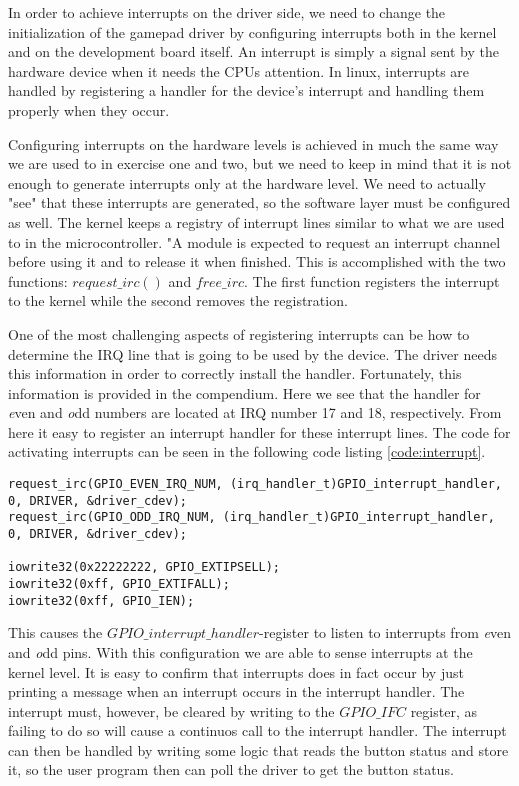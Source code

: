In order to achieve interrupts on the driver side, we need to change the initialization of the gamepad driver by configuring interrupts both in the kernel and on the development board itself. An interrupt is simply a signal sent by the hardware device when it needs the CPUs attention. In linux, interrupts are handled by registering a handler for the device's interrupt and handling them properly when they occur. 

Configuring interrupts on the hardware levels is achieved in much the same way we are used to in exercise one and two, but we need to keep in mind that it is not enough to generate interrupts only at the hardware level. We need to actually "see" that these interrupts are generated, so the software layer must be configured as well. The kernel keeps a registry of interrupt lines similar to what we are used to in the microcontroller. "A module is expected to request an interrupt channel before using it and to release it when finished. This is accomplished with the two functions: $request\_irc()$ and $free\_irc$. The first function registers the interrupt to the kernel while the second removes the registration. 

One of the most challenging aspects of registering interrupts can be how to determine the IRQ line that is going to be used by the device. The driver needs this information in order to correctly install the handler. Fortunately, this information is provided in the compendium. Here we see that the handler for {\emph even} and {\emph odd} numbers are located at IRQ number 17 and 18, respectively. From here it easy to register an interrupt handler for these interrupt lines. The code for activating interrupts can be seen in the following code listing \ref{code:interrupt}.

\begin{lstlisting}[caption=Activate interupts, label=code:interrupt]
request_irc(GPIO_EVEN_IRQ_NUM, (irq_handler_t)GPIO_interrupt_handler, 0, DRIVER, &driver_cdev);
request_irc(GPIO_ODD_IRQ_NUM, (irq_handler_t)GPIO_interrupt_handler, 0, DRIVER, &driver_cdev);

iowrite32(0x22222222, GPIO_EXTIPSELL);
iowrite32(0xff, GPIO_EXTIFALL);
iowrite32(0xff, GPIO_IEN);
\end{lstlisting}



This causes the $GPIO\_interrupt\_handler$-register to listen to interrupts from {\emph even} and {\emph odd} pins. With this configuration we are able to sense interrupts at the kernel level. It is easy to confirm that interrupts does in fact occur by just printing a message when an interrupt occurs in the interrupt handler. The interrupt must, however, be cleared by writing to the $GPIO\_IFC$ register, as failing to do so will cause a continuos call to the interrupt handler. The interrupt can then be handled by writing some logic that reads the button status and store it, so the user program then can poll the driver to get the button status. 


